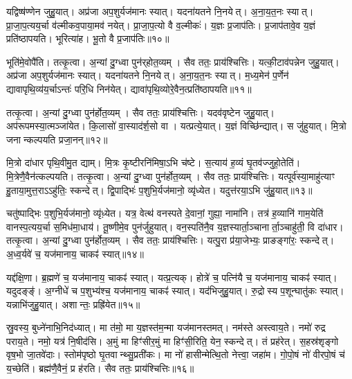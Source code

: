 यद्विष्ष॑ण्णेन जुहु॒यात्।
अप्र॑जा अप॒शुर्यज॑मानः स्यात्।
यदना॑यतने नि॒नयेत्।
अ॒ना॒य॒त॒नः स्यात्।
प्रा॒जा॒प॒त्यय॒र्चा व॑ल्मीकव॒पाया॒मव॑ नयेत्।
प्रा॒जा॒प॒त्यो वै व॒ल्मीकः॑।
य॒ज्ञः प्र॒जाप॑तिः।
प्र॒जाप॑तावे॒व य॒ज्ञं प्रति॑ष्ठापयति।
भूरित्या॑ह।
भू॒तो वै प्र॒जाप॑तिः॥१०॥

भूति॑मे॒वोपै॑ति।
तत्कृ॒त्वा।
अ॒न्यां दु॒ग्ध्वा पुन॑र्‌\mbox{}होत॒व्यम्।
सैव ततः॒ प्राय॑श्चित्तिः।
यत्की॒टाव॑पन्नेन जुहु॒यात्।
अप्र॑जा अप॒शुर्यज॑मानः स्यात्।
यदना॑यतने नि॒नयेत्।
अ॒ना॒य॒त॒नः स्यात्।
म॒ध्य॒मेन॑ प॒र्णेन॑ द्यावापृथि॒व्य॑य॒र्चा\-ऽन्तः॑ परि॒धि निन॑येत्।
द्यावा॑पृथि॒व्योरे॒वैन॒त्प्रति॑ष्ठापयति॥११॥

तत्कृ॒त्वा।
अ॒न्यां दु॒ग्ध्वा पुन॑र्\mbox{}होत॒व्यम्।
सैव ततः॒ प्राय॑श्चित्तिः।
यदव॑वृष्टेन जुहु॒यात्।
अप॑रूपमस्या॒त्मञ्जा॑येत।
कि॒लासो॑ वा॒स्याद॑र्\mbox{}श॒सो वा।
यत्प्रत्ये॒यात्।
य॒ज्ञं विच्छि॑न्द्यात्।
स जु॑हुयात्।
मि॒त्रो जनान्कल्पयति प्रजा॒नन्॥१२॥

मि॒त्रो दा॑धार पृथि॒वीमु॒त द्याम्।
मि॒त्रः कृ॒ष्टीरनि॑मिषा॒ऽभि च॑ष्टे।
स॒त्याय॑ ह॒व्यं घृ॒तव॑ज्जुहो॒तेति॑।
मि॒त्रेणै॒वैन॑त्कल्पयति।
तत्कृ॒त्वा।
अ॒न्यां दु॒ग्ध्वा पुन॑र्\mbox{}होत॒व्यम्।
सैव ततः॒ प्राय॑श्चित्तिः।
यत्पूर्व॑स्या॒माहु॑त्याꣳ हु॒ताया॒मुत्त॒रा\-ऽऽहु॑तिः॒ स्कन्देत्।
द्वि॒पाद्भिः॑ प॒शुभि॒र्यज॑मानो॒ व्यृ॑ध्येत।
यदुत्त॑रया॒ऽभि जु॑हु॒यात्॥१३॥

चतु॑ष्पाद्भिः प॒शुभि॒र्यज॑मानो॒ व्यृ॑ध़्येत।
यत्र॒ वेत्थ॑ वनस्पते दे॒वानां॒ गुह्या॒ नामा॑नि।
तत्र॑ ह॒व्यानि॑ गाम॒येति॑ वानस्प॒त्यय॒र्चा स॒मिध॑मा॒धाय॑।
तू॒ष्णीमे॒व पुन॑र्जुहुयात्।
वन॒स्पति॑नै॒व य॒ज्ञस्यार्ता॒ञ्चानार्ता॒ञ्चाहु॑ती॒ वि दा॑धार।
तत्कृ॒त्वा।
अ॒न्यां दु॒ग्ध्वा पुन॑र्\mbox{}होत॒व्यम्।
सैव ततः॒ प्राय॑श्चित्तिः।
यत्पु॒रा प्र॑या॒जेभ्यः॒ प्राङङ्गा॑रः॒ स्कन्देत्।
अ॒ध्व॒र्यवे॑ च॒ यज॑मानाय॒ चाकꣴ॑ स्यात्॥१४॥

यद्द॑क्षि॒णा।
ब्र॒ह्मणे॑ च॒ यज॑मानाय॒ चाकꣴ॑ स्यात्।
यत्प्र॒त्यक्।
होत्रे॑ च॒ पत्नि॑यै च॒ यज॑मानाय॒ चाकꣴ॑ स्यात्।
यदुदङ्ङ्॑।
अ॒ग्नीधे॑ च प॒शुभ्य॑श्च॒ यज॑मानाय॒ चाकꣴ॑ स्यात्।
यद॑भिजुहु॒यात्।
रु॒द्रोस्य प॒शून्घातु॑कः स्यात्।
यन्नाभि॑जुहु॒यात्।
अशान्तः॒ प्रह्रि॑येत॥१५॥

स्रु॒वस्य॒ बुध्ने॑नाभि॒निद॑ध्यात्।
मा त॑मो॒ मा य॒ज्ञस्त॑म॒न्मा यज॑मानस्तमत्।
नम॑स्ते अस्त्वाय॒ते।
नमो॑ रुद्र पराय॒ते।
नमो॒ यत्र॑ नि॒षीद॑सि।
अ॒मुं मा हिꣳ॑सीर॒मुं मा हिꣳ॑सी॒रिति॒ येन॒ स्कन्देत्।
तं प्रह॑रेत्।
स॒हस्र॑शृङ्गो वृष॒भो जा॒तवे॑दाः।
स्तोम॑पृष्ठो घृ॒तवान्थ्सु॒प्रती॑कः।
मा नो॑ हासीन्मेत्थि॒तो नेत्त्वा॒ जहा॑म।
गो॒पो॒षं नो॑ वीरपो॒षं च॑ य॒च्छेति॑।
ब्रह्म॑णै॒वैनं॒ प्र ह॑रति।
सैव ततः॒ प्राय॑श्चित्तिः॥१६॥

